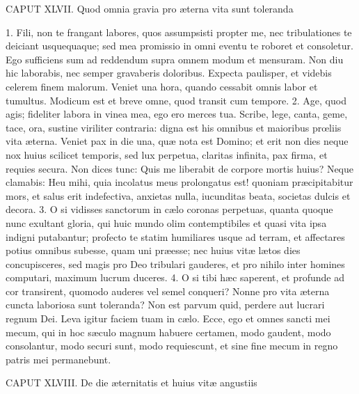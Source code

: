 CAPUT XLVII.
Quod omnia gravia pro æterna vita sunt toleranda

1. Fili, non te frangant labores, quos assumpsisti propter me, nec tribulationes te deiciant usquequaque; sed mea promissio in omni eventu te roboret et consoletur. Ego sufficiens sum ad reddendum supra omnem modum et mensuram. Non diu hic laborabis, nec semper gravaberis doloribus. Expecta paulisper, et videbis celerem finem malorum. Veniet una hora, quando cessabit omnis labor et tumultus. Modicum est et breve omne, quod transit cum tempore.
2. Age, quod agis; fideliter labora in vinea mea, ego ero merces tua. Scribe, lege, canta, geme, tace, ora, sustine viriliter contraria: digna est his omnibus et maioribus prœliis vita æterna. Veniet pax in die una, quæ nota est Domino; et erit non dies neque nox huius scilicet temporis, sed lux perpetua, claritas infinita, pax firma, et requies secura. Non dices tunc: Quis me liberabit de corpore mortis huius? Neque clamabis: Heu mihi, quia incolatus meus prolongatus est! quoniam præcipitabitur mors, et salus erit indefectiva, anxietas nulla, iucunditas beata, societas dulcis et decora.
3. O si vidisses sanctorum in cælo coronas perpetuas, quanta quoque nunc exultant gloria, qui huic mundo olim contemptibiles et quasi vita ipsa indigni putabantur; profecto te statim humiliares usque ad terram, et affectares potius omnibus subesse, quam uni præesse; nec huius vitæ lætos dies concupisceres, sed magis pro Deo tribulari gauderes, et pro nihilo inter homines computari, maximum lucrum duceres.
4. O si tibi hæc saperent, et profunde ad cor transirent, quomodo auderes vel semel conqueri? Nonne pro vita æterna cuncta laboriosa sunt toleranda? Non est parvum quid, perdere aut lucrari regnum Dei. Leva igitur faciem tuam in cælo. Ecce, ego et omnes sancti mei mecum, qui in hoc sæculo magnum habuere certamen, modo gaudent, modo consolantur, modo securi sunt, modo requiescunt, et sine fine mecum in regno patris mei permanebunt.


CAPUT XLVIII.
De die æternitatis et huius vitæ angustiis

